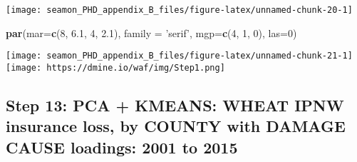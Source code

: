 \documentclass[]{article}
\newenvironment{Shaded}{\begin{snugshade}}{\end{snugshade}}
\newcommand{\CommentTok}[1]{\textcolor[rgb]{0.56,0.35,0.01}{\textit{#1}}}
\newcommand{\DataTypeTok}[1]{\textcolor[rgb]{0.13,0.29,0.53}{#1}}
\newcommand{\DecValTok}[1]{\textcolor[rgb]{0.00,0.00,0.81}{#1}}
\newcommand{\FloatTok}[1]{\textcolor[rgb]{0.00,0.00,0.81}{#1}}
\newcommand{\KeywordTok}[1]{\textcolor[rgb]{0.13,0.29,0.53}{\textbf{#1}}}
\newcommand{\NormalTok}[1]{#1}
\newcommand{\OperatorTok}[1]{\textcolor[rgb]{0.81,0.36,0.00}{\textbf{#1}}}
\newcommand{\StringTok}[1]{\textcolor[rgb]{0.31,0.60,0.02}{#1}}
\begin{document}
\texttt{[image: seamon\_PHD\_appendix\_B\_files/figure-latex/unnamed-chunk-20-1]}

\begin{Shaded}
\begin{Highlighting}[]
\KeywordTok{par}\NormalTok{(}\DataTypeTok{mar=}\KeywordTok{c}\NormalTok{(}\DecValTok{8}\NormalTok{, }\FloatTok{6.1}\NormalTok{, }\DecValTok{4}\NormalTok{, }\FloatTok{2.1}\NormalTok{), }\DataTypeTok{family =} \StringTok{'serif'}\NormalTok{, }\DataTypeTok{mgp=}\KeywordTok{c}\NormalTok{(}\DecValTok{4}\NormalTok{, }\DecValTok{1}\NormalTok{, }\DecValTok{0}\NormalTok{), }\DataTypeTok{las=}\DecValTok{0}\NormalTok{)}
\end{Highlighting}
\end{Shaded}

\begin{Shaded}
\end{Shaded}

\texttt{[image: seamon\_PHD\_appendix\_B\_files/figure-latex/unnamed-chunk-21-1]}
\texttt{[image: https://dmine.io/waf/img/Step1.png]}

\hypertarget{step-13-pca-kmeans-wheat-ipnw-insurance-loss-by-county-with-damage-cause-loadings-2001-to-2015}{%
\subsection{Step 13: PCA + KMEANS: WHEAT IPNW insurance loss, by COUNTY
with DAMAGE CAUSE loadings: 2001 to
2015}\label{step-13-pca-kmeans-wheat-ipnw-insurance-loss-by-county-with-damage-cause-loadings-2001-to-2015}}
\end{document}
